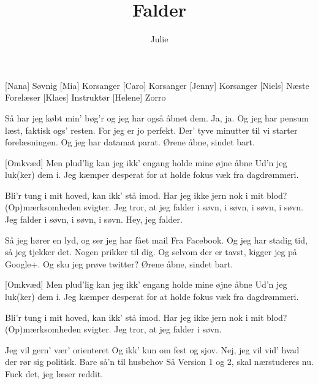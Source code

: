 \documentclass[a4paper,11pt]{article}
\title{Falder}
\author{Julie}
\begin{document}
\maketitle

\begin{roles}
[Nana] Søvnig
[Mia] Korsanger
[Caro] Korsanger
[Jenny] Korsanger
[Niels] Næste Forelæser
[Klaes] Instruktør
[Helene] Zorro
\end{roles}

\begin{song}
   Så har jeg købt min' bøg'r og jeg har også åbnet dem.
     Ja, ja.
    Og jeg har pensum læst, faktisk ogs' resten.
    For jeg er jo perfekt.
    Der' tyve minutter til vi starter forelæsningen.
    Og jeg har datamat parat.
    Ørene åbne, sindet bart.


  [Omkvæd] Men plud'lig kan jeg ikk' engang holde mine øjne åbne
    Ud'n jeg luk(ker) dem i.
    Jeg kæmper desperat for at holde fokus væk
    fra dagdrømmeri.


    Bli'r tung i mit hoved,
    kan ikk' stå imod.
    Har jeg ikke jern nok i mit blod?
    (Op)mærksomheden svigter.
    Jeg tror, at jeg falder i søvn,
    i søvn, i søvn,  i søvn.
     Jeg falder
    i søvn, i søvn, i søvn. 
    Hey, jeg falder. 


   Så jeg hører en lyd, og ser jeg har fået mail
    Fra Facebook.
    Og jeg har stadig tid,
    så jeg tjekker det. 
     Nogen prikker til dig.
     Og selvom der er tavst, kigger jeg på Google+. 
    Og sku jeg prøve twitter?
    Ørene åbne, sindet bart.


  [Omkvæd] Men plud'lig kan jeg ikk' engang holde mine øjne åbne
    Ud'n jeg luk(ker) dem i.
    Jeg kæmper desperat for at holde fokus væk
    fra dagdrømmeri.


    Bli'r tung i mit hoved,
    kan ikk' stå imod.
    Har jeg ikke jern nok i mit blod?
    (Op)mærksomheden svigter.
    Jeg tror, at jeg falder i søvn.


   Jeg vil gern' vær' orienteret
    Og ikk' kun om fest og sjov.
    Nej, jeg vil vid' hvad der rør sig politisk.
    Bare så'n til husbehov
    Så Version 1 og 2, skal nærstuderes nu.
    Fuck det, jeg læser reddit.



\end{song}
\end{document}
